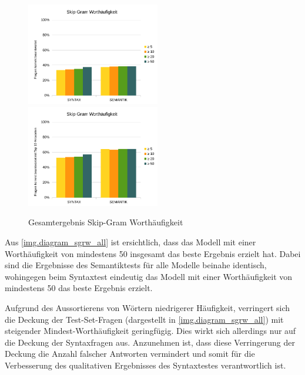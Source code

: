 \begin{figure}[H]
\begin{adjustwidth}{-4mm}{-4mm}
\centering
{}
{\includegraphics[width=0.52\textwidth]{images/diagram_sgrw_correct_all}}
{\includegraphics[width=0.52\textwidth]{images/diagram_sgrw_top10_all}}
\caption[Gesamtergebnis Skip-Gram Worthäufigkeit]{Gesamtergebnis Skip-Gram Worthäufigkeit}\label{img.diagram_sgrw_all}
\end{adjustwidth}
\end{figure}

Aus \autoref{img.diagram_sgrw_all} ist ersichtlich, dass das Modell  mit einer Worthäufigkeit von mindestens 50 insgesamt das beste Ergebnis erzielt hat. Dabei sind die Ergebnisse des Semantiktests für alle Modelle beinahe identisch, wohingegen beim Syntaxtest eindeutig das Modell mit einer Worthäufigkeit von mindestens 50 das beste Ergebnis erzielt.


Aufgrund des Aussortierens von Wörtern niedrigerer Häufigkeit, verringert sich die Deckung der Test-Set-Fragen (dargestellt in \autoref{img.diagram_sgrw_all}) mit steigender Mindest-Worthäufigkeit geringfügig. Dies wirkt sich allerdings nur auf die Deckung der Syntaxfragen aus. Anzunehmen ist, dass diese Verringerung der Deckung die Anzahl falscher Antworten vermindert und somit für die Verbesserung des qualitativen Ergebnisses des Syntaxtestes verantwortlich ist.

